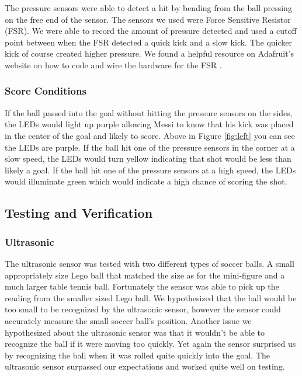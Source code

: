 \documentclass[12pt]{article}
\begin{document}
The pressure sensors were able to detect a hit by bending from the ball pressing on the free end of the sensor. The sensors we used were Force Sensitive Resistor (FSR). We were able to record the amount of pressure detected and used a cutoff point between when the FSR detected a quick kick and a slow kick. The quicker kick of course created higher pressure. We found a helpful resource on Adafruit's website on how to code and wire the hardware for the FSR \cite{Adafruit}. %


\subsubsection{Score Conditions}
If the ball passed into the goal without hitting the pressure sensors on the sides, the LEDs would light up purple allowing Messi to know that his kick was placed in the center of the goal and likely to score. Above in Figure \ref{fig:left} you can see the LEDs are purple. If the ball hit one of the pressure sensors in the corner at a slow speed, the LEDs would turn yellow indicating that shot would be less than likely a goal. If the ball hit one of the pressure sensors at a high speed, the LEDs would illuminate green which would indicate a high chance of scoring the shot. 



\subsection{Testing and Verification}

\subsubsection{Ultrasonic}

The ultrasonic sensor was tested with two different types of soccer balls. A small appropriately size Lego ball that matched the size as for the mini-figure and a much larger table tennis ball. Fortunately the sensor was able to pick up the reading from the smaller sized Lego ball. We hypothesized that the ball would be too small to be recognized by the ultrasonic sensor, however the sensor could accurately measure the small soccer ball's position. Another issue we hypothesized about the ultrasonic sensor was that it wouldn't be able to recognize the ball if it were moving too quickly. Yet again the sensor surprised us by recognizing the ball when it was rolled quite quickly into the goal. The ultrasonic sensor surpassed our expectations and worked quite well on testing.  
\end{document}
